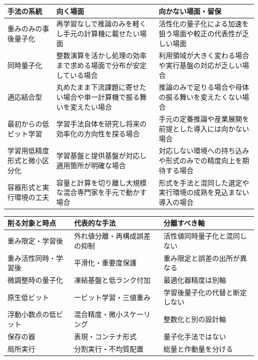\documentclass[lualatex,a4paper,10pt]{jlreq}
\begin{document}
\begin{center}
\small
\begin{tabularx}{\textwidth}{@{}p{}p{}X@{}}
\toprule
手法の系統 & 向く場面 & 向かない場面・留保 \\
\midrule
重みのみの事後量子化 & 再学習なしで推論のみを軽くし手元の計算機に載せたい場面 & 活性化の量子化による加速を狙う場面や較正の代表性が乏しい場面 \\
同時量子化 & 整数演算を活かし処理の効率まで求める場面で分布が安定している場合 & 利用領域が大きく変わる場合や実行基盤の対応が乏しい場合 \\
適応結合型 & 丸めたまま下流課題に寄せたい場合や単一計算機で振る舞いを変えたい場合 & 推論のみで足りる場合や母体の振る舞いを変えたくない場合 \\
最初からの低ビット学習 & 学習手法自体を研究し将来の効率化の方向性を探る場合 & 手元の定番推論や産業展開を前提とした導入には向かない場合 \\
学習用低精度形式と微小区分化 & 学習基盤と提供基盤が対応し適用箇所が明確な場合 & 対応しない環境への持ち込みや形式のみでの精度向上を期待する場合 \\
容器形式と実行環境の工夫 & 容量と計算を切り離し大規模な混合専門家を手元で動かす場合 & 形式を手法と混同した選定や実行環境の成熟を見込まない導入の場合 \\
\bottomrule
\end{tabularx}
\end{center}

\begin{center}
\small
\begin{tabularx}{\textwidth}{@{}p{}p{}X@{}}
\toprule
削る対象と時点 & 代表的な手法 & 分離すべき軸 \\
\midrule
重み限定・学習後 & 外れ値分離・再構成誤差の抑制 & 活性値同時量子化と混同しない \\
重み活性同時・学習後 & 平滑化・重要度保護 & 重み限定と誤差の出所が異なる \\
微調整時の量子化 & 凍結基盤と低ランク付加 & 最適化器精度は別軸 \\
原生低ビット & 一ビット学習・三値重み & 学習後量子化の代替と断定しない \\
浮動小数点の低ビット & 混合精度・微小スケーリング & 整数化と別の設計軸 \\
保存の器 & 表現・コンテナ形式 & 量子化手法ではない \\
局所実行 & 分割実行・不均質配置 & 総量と作動量を分ける \\
\bottomrule
\end{tabularx}
\end{center}
\autocite{llmint8,gptq,qlora,gguf,fp8formats,bitnet}
\end{document}
